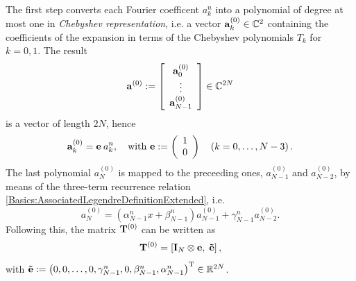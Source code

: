 The first step converts each Fourier coefficent $a_{k}^n$ into a polynomial of degree at 
most one in \emph{Chebyshev representation}, i.e. a vector $\mathbf{a}_{k}^{(0)} \in \mathbb{C}^2$ containing 
the coefficients of the expansion in terms of the Chebyshev polynomials $T_{k}$ for $k=0,1$. 
The result 
\[
  \mathbf{a}^{(0)} := 
    \left[\begin{array}{c}
      \mathbf{a}_{0}^{(0)}\\
      \vdots\\
      \mathbf{a}_{N-1}^{(0)}
    \end{array}\right] 
    \in \mathbb{C}^{2N}
\] 
is a vector of length $2N$, hence 
\[ 
  \mathbf{a}_{k}^{(0)} = \mathbf{e} \: a_{k}^n,\quad \text{with } \mathbf{e} := \left(\begin{array}{l}1\\0\end{array}\right) \quad \left(k = 0,\ldots,N-3\right).
\]
The last polynomial $a_{N}^{(0)}$ is mapped to the preceeding ones, $a_{N-1}^{(0)}$ and $a_{N-2}^{(0)}$, by means of the three-term 
recurrence relation \eqref{Basics:AssociatedLegendreDefinitionExtended}, i.e. 
\[
  a_{N}^{(0)} = \left(\alpha_{N-1}^n x + \beta_{N-1}^n\right)a_{N-1}^{(0)} + \gamma_{N-1}^n a_{N-2}^{(0)}.
\]
Following this, the matrix $\mathbf{T}^{(0)}$ can be written as 
\[
  \mathbf{T}^{(0)} = \left[\mathbf{I}_{N} \otimes \mathbf{e},\;\mathbf{\tilde{e}}\right],
\]
with $\mathbf{\tilde{e}} := \left(0,0,\dots,0,\gamma_{N-1}^n, 0, \beta_{N-1}^n,\alpha_{N-1}^n\right)^{\text{\rm{T}}} \in \mathbb{R}^{2N}$.

